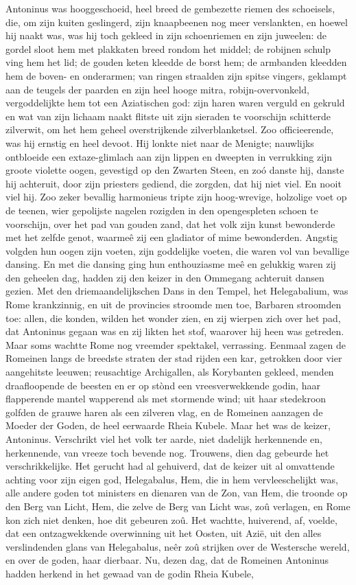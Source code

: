 \documentclass[a4paper, 12pt, oneside, dutch]{article}
\begin{document}
Antoninus was hooggeschoeid, heel breed de gembezette riemen des schoeisels, die, om zijn kuiten geslingerd, zijn knaapbeenen nog meer verslankten, en hoewel hij naakt was, was hij toch gekleed in zijn schoenriemen en zijn juweelen: de gordel sloot hem met plakkaten breed rondom het middel; de robijnen schulp ving hem het lid; de gouden keten kleedde de borst hem; de armbanden kleedden hem de boven- en onderarmen; van ringen straalden zijn spitse vingers, geklampt aan de teugels der paarden en zijn heel hooge mitra, robijn-overvonkeld, vergoddelijkte hem tot een Aziatischen god: zijn haren waren verguld en gekruld en wat van zijn lichaam naakt flitste uit zijn sieraden te voorschijn schitterde zilverwit, om het hem geheel overstrijkende zilverblanketsel. Zoo officieerende, was hij ernstig en heel devoot. Hij lonkte niet naar de Menigte; nauwlijks ontbloeide een extaze-glimlach aan zijn lippen en dweepten in verrukking zijn groote violette oogen, gevestigd op den Zwarten Steen, en zoó danste hij, danste hij achteruit, door zijn priesters gediend, die zorgden, dat hij niet viel. En nooit viel hij. Zoo zeker bevallig harmonieus tripte zijn hoog-wrevige, holzolige voet op de teenen, wier gepolijste nagelen rozigden in den opengespleten schoen te voorschijn, over het pad van gouden zand, dat het volk zijn kunst bewonderde met het zelfde genot, waarmeê zij een gladiator of mime bewonderden. Angstig volgden hun oogen zijn voeten, zijn goddelijke voeten, die waren vol van bevallige dansing. En met die dansing ging hun enthouziasme meê en gelukkig waren zij den geheelen dag, hadden zij den keizer in den Ommegang achteruit dansen gezien. Met den driemaandelijkschen Dans in den Tempel, het Helegabalium, was Rome krankzinnig, en uit de provincies stroomde men toe, Barbaren stroomden toe: allen, die konden, wilden het wonder zien, en zij wierpen zich over het pad, dat Antoninus gegaan was en zij likten het stof, waarover hij heen was getreden. Maar soms wachtte Rome nog vreemder spektakel, verrassing. Eenmaal zagen de Romeinen langs de breedste straten der stad rijden een kar, getrokken door vier aangehitste leeuwen; reusachtige Archigallen, als Korybanten gekleed, menden draafloopende de beesten en er op stònd een vreesverwekkende godin, haar flapperende mantel wapperend als met stormende wind; uit haar stedekroon golfden de grauwe haren als een zilveren vlag, en de Romeinen aanzagen de Moeder der Goden, de heel eerwaarde Rheia Kubele. Maar het was de keizer, Antoninus. Verschrikt viel het volk ter aarde, niet dadelijk herkennende en, herkennende, van vreeze toch bevende nog. Trouwens, dien dag gebeurde het verschrikkelijke. Het gerucht had al gehuiverd, dat de keizer uit al omvattende achting voor zijn eigen god, Helegabalus, Hem, die in hem vervleeschelijkt was, alle andere goden tot ministers en dienaren van de Zon, van Hem, die troonde op den Berg van Licht, Hem, die zelve de Berg van Licht was, zoû verlagen, en Rome kon zich niet denken, hoe dit gebeuren zoû. Het wachtte, huiverend, af, voelde, dat een ontzagwekkende overwinning uit het Oosten, uit Azië, uit den alles verslindenden glans van Helegabalus, neêr zoû strijken over de Westersche wereld, en over de goden, haar dierbaar. Nu, dezen dag, dat de Romeinen Antoninus hadden herkend in het gewaad van de godin Rheia Kubele, 
\end{document}

